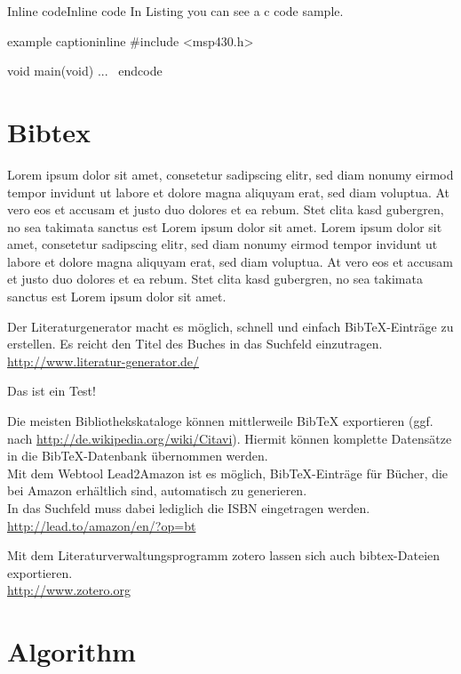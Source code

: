 \begin{code}[tex]{Inline code}{Inline code}
In Listing  you can see a c code sample.

\begin{code}[c]{example caption}{inline}
#include <msp430.h> 

void main(void) {
...
}
\ end{code}
\end{code}

\section{Bibtex}

Lorem ipsum dolor sit amet, consetetur sadipscing elitr, sed diam nonumy eirmod tempor invidunt ut labore et dolore magna aliquyam erat, sed diam voluptua. At vero eos et accusam et justo duo dolores et ea rebum. Stet clita kasd gubergren, no sea takimata sanctus est Lorem ipsum dolor sit amet. Lorem ipsum dolor sit amet, consetetur sadipscing elitr, sed diam nonumy eirmod tempor invidunt ut labore et dolore magna aliquyam erat, sed diam voluptua. At vero eos et accusam et justo duo dolores et ea rebum. Stet clita kasd gubergren, no sea takimata sanctus est Lorem ipsum dolor sit amet. \cite{bibtex.a}

Der Literaturgenerator macht es möglich, schnell und einfach BibTeX-Einträge zu erstellen.
Es reicht den Titel des Buches in das Suchfeld einzutragen.\\
\url{http://www.literatur-generator.de/}

Das ist ein Test! \cite{zheng2012}

Die meisten Bibliothekskataloge können mittlerweile BibTeX exportieren (ggf. nach \url{http://de.wikipedia.org/wiki/Citavi}). Hiermit können komplette Datensätze in die BibTeX-Datenbank übernommen werden.\\
Mit dem Webtool Lead2Amazon ist es möglich, BibTeX-Einträge für Bücher, die bei Amazon erhältlich sind, automatisch zu generieren.\\
In das Suchfeld muss dabei lediglich die ISBN eingetragen werden.\\
\url{http://lead.to/amazon/en/?op=bt}

Mit dem Literaturverwaltungsprogramm zotero lassen sich auch bibtex-Dateien exportieren.\\
\url{http://www.zotero.org}

\section{Algorithm}


\end{code}
